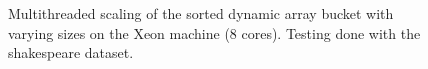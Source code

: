 \begin{landscape}
\begin{figure}[!h]
{        }
        \label{fig:ts_ask_i7_sorted}
        \caption{Multithreaded scaling of the sorted dynamic array bucket with varying sizes on the
        Xeon machine (8 cores). Testing done with the shakespeare dataset.}
    \end{figure}
    \begin{figure}[!h]
\end{figure}
\end{landscape}
